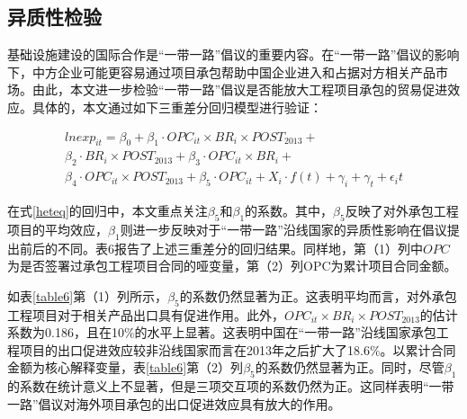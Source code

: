 \documentclass[a4paper,12pt]{article}
\begin{document}
\subsection{异质性检验}
基础设施建设的国际合作是“一带一路”倡议的重要内容。在“一带一路”倡议的影响下，中方企业可能更容易通过项目承包帮助中国企业进入和占据对方相关产品市场。由此，本文进一步检验“一带一路”倡议是否能放大工程项目承包的贸易促进效应。具体的，本文通过如下三重差分回归模型进行验证：


\begin{equation}\label{heteq}
	\begin{aligned}
	lnexp_{it}=\beta_0+\beta_1·{OPC}_{it}\times{BR}_i\times{POST}_{2013}+\\ 
	\beta_2·{BR}_i\times{POST}_{2013}+\beta_3·{OPC}_{it}\times{BR}_i+\\ 
	\beta_4·{OPC}_{it}\times{POST}_{2013}+\beta_5·{OPC}_{it}+X_i·f(t)+\gamma_i+\gamma_t+\epsilon_it 
	\end{aligned}
\end{equation}


在式\ref{heteq}的回归中，本文重点关注$\beta_5$和$\beta_1$的系数。其中，$\beta_5$反映了对外承包工程项目的平均效应，$\beta_1$则进一步反映对于“一带一路”沿线国家的异质性影响在倡议提出前后的不同。表6报告了上述三重差分的回归结果。同样地，第（1）列中$OPC$为是否签署过承包工程项目合同的哑变量，第（2）列OPC为累计项目合同金额。

\vspace{0.5em}  %

如表\ref{table6}第（1）列所示，$\beta_5$的系数仍然显著为正。这表明平均而言，对外承包工程项目对于相关产品出口具有促进作用。此外，${OPC}_{it}\times{BR}_i\times{POST}_{2013}$的估计系数为0.186，且在10\%的水平上显著。这表明中国在“一带一路”沿线国家承包工程项目的出口促进效应较非沿线国家而言在2013年之后扩大了18.6\%。以累计合同金额为核心解释变量，表\ref{table6}第（2）列$\beta_5$的系数仍然显著为正。同时，尽管$\beta_1$的系数在统计意义上不显著，但是三项交互项的系数仍然为正。这同样表明“一带一路”倡议对海外项目承包的出口促进效应具有放大的作用。
\end{document}
